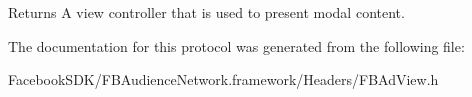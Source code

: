 \begin{DoxyReturn}{Returns}
A view controller that is used to present modal content. 
\end{DoxyReturn}


The documentation for this protocol was generated from the following file\-:\begin{DoxyCompactItemize}
\item 
Facebook\-S\-D\-K/\-F\-B\-Audience\-Network.\-framework/\-Headers/F\-B\-Ad\-View.\-h\end{DoxyCompactItemize}
